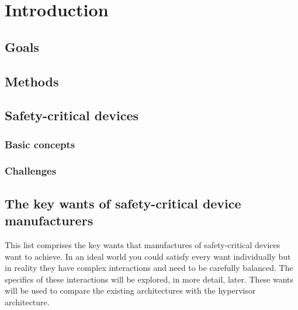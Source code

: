 
\chapter{Introduction} %

\label{Chapter1} %


\newcommand{\keyword}[1]{\textbf{#1}}
\newcommand{\tabhead}[1]{\textbf{#1}}
\newcommand{\code}[1]{\texttt{#1}}
\newcommand{\file}[1]{\texttt{\bfseries#1}}
\newcommand{\option}[1]{\texttt{\itshape#1}}


\section{Goals}


\section{Methods}


\section{Safety-critical devices}
\subsection{Basic concepts}
\subsection{Challenges}


\section{The key wants of safety-critical device manufacturers}
This list comprises the key wants that manufactures of safety-critical devices want to achieve. In an ideal world you could satisfy every want individually but in reality they have complex interactions and need to be carefully balanced. The specifics of these interactions will be explored, in more detail, later. These wants will be used to compare the existing architectures with the hypervisor architecture.


